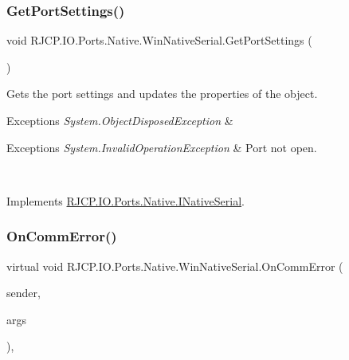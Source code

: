 \mbox{\label{class_r_j_c_p_1_1_i_o_1_1_ports_1_1_native_1_1_win_native_serial_a105066f9892f3f00900691a51d5ce40d}} 
\subsubsection{\texorpdfstring{GetPortSettings()}{GetPortSettings()}}
{\footnotesize\ttfamily void R\+J\+C\+P.\+I\+O.\+Ports.\+Native.\+Win\+Native\+Serial.\+Get\+Port\+Settings (\begin{DoxyParamCaption}{ }\end{DoxyParamCaption})}



Gets the port settings and updates the properties of the object. 


\begin{DoxyExceptions}{Exceptions}
{\em System.\+Object\+Disposed\+Exception} & 
\begin{DoxyExceptions}{Exceptions}
{\em System.\+Invalid\+Operation\+Exception} & Port not open.\\
\hline
\end{DoxyExceptions}
\\
\hline
\end{DoxyExceptions}


Implements \mbox{\hyperlink{interface_r_j_c_p_1_1_i_o_1_1_ports_1_1_native_1_1_i_native_serial_aee35b004a7e64a44e11271261e635107}{R\+J\+C\+P.\+I\+O.\+Ports.\+Native.\+I\+Native\+Serial}}.

\mbox{\label{class_r_j_c_p_1_1_i_o_1_1_ports_1_1_native_1_1_win_native_serial_ac40ba5f302e120f59c241c05b26aaf68}} 
\subsubsection{\texorpdfstring{OnCommError()}{OnCommError()}}
{\footnotesize\ttfamily virtual void R\+J\+C\+P.\+I\+O.\+Ports.\+Native.\+Win\+Native\+Serial.\+On\+Comm\+Error (\begin{DoxyParamCaption}\item[{object}]{sender,  }\item[{\mbox{\hyperlink{class_r_j_c_p_1_1_i_o_1_1_ports_1_1_serial_error_received_event_args}{Serial\+Error\+Received\+Event\+Args}}}]{args }\end{DoxyParamCaption})\hspace{0.3cm}{\ttfamily [protected]}, {\ttfamily [virtual]}}




